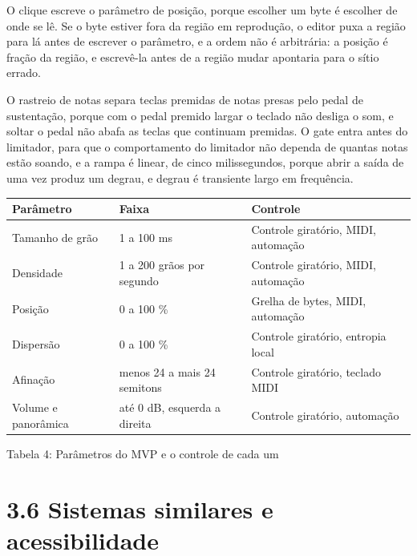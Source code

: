 \documentclass[11pt,a4paper]{article}
\begin{document}
O clique escreve o parâmetro de posição, porque escolher um byte é escolher de onde se lê. Se o byte estiver fora da região em reprodução, o editor puxa a região para lá antes de escrever o parâmetro, e a ordem não é arbitrária: a posição é fração da região, e escrevê-la antes de a região mudar apontaria para o sítio errado.


O rastreio de notas separa teclas premidas de notas presas pelo pedal de sustentação, porque com o pedal premido largar o teclado não desliga o som, e soltar o pedal não abafa as teclas que continuam premidas. O gate entra antes do limitador, para que o comportamento do limitador não dependa de quantas notas estão soando, e a rampa é linear, de cinco milissegundos, porque abrir a saída de uma vez produz um degrau, e degrau é transiente largo em frequência.


\begin{center}
\scriptsize
\setlength{\tabcolsep}{4pt}
\begin{tabular}{p{}|p{}|p{}}
\hline
\textbf{Parâmetro} & \textbf{Faixa} & \textbf{Controle} \\
\hline
Tamanho de grão & 1 a 100 ms & Controle giratório, MIDI, automação \\
Densidade & 1 a 200 grãos por segundo & Controle giratório, MIDI, automação \\
Posição & 0 a 100 \% & Grelha de bytes, MIDI, automação \\
Dispersão & 0 a 100 \% & Controle giratório, entropia local \\
Afinação & menos 24 a mais 24 semitons & Controle giratório, teclado MIDI \\
Volume e panorâmica & até 0 dB, esquerda a direita & Controle giratório, automação \\
\hline
\end{tabular}
\end{center}
\noindent Tabela 4: Parâmetros do MVP e o controle de cada um\par
\label{tab:4}
\vspace{2pt}{\footnotesize\noindent Autores\par}

\section*{3.6 Sistemas similares e acessibilidade}
\end{document}
